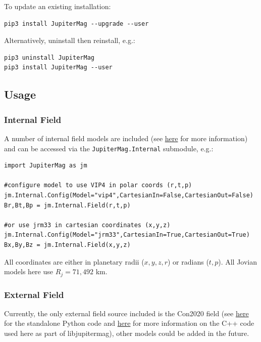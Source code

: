 		To update an existing installation:
	
		\begin{verbatim}
pip3 install JupiterMag --upgrade --user
		\end{verbatim}
	
		Alternatively, uninstall then reinstall, e.g.:
	
		\begin{verbatim}
pip3 uninstall JupiterMag
pip3 install JupiterMag --user
		\end{verbatim}
	
	\subsection{Usage}
	
	\subsubsection{Internal Field}
	
		A number of internal field models are included (see \href{https://github.com/mattkjames7/libinternalfield/blob/main/README.md}{here} for more information) and can be accessed via the \texttt{JupiterMag.Internal} submodule, e.g.:
	
		\begin{verbatim}
import JupiterMag as jm
	
#configure model to use VIP4 in polar coords (r,t,p)
jm.Internal.Config(Model="vip4",CartesianIn=False,CartesianOut=False)
Br,Bt,Bp = jm.Internal.Field(r,t,p)
	
#or use jrm33 in cartesian coordinates (x,y,z)
jm.Internal.Config(Model="jrm33",CartesianIn=True,CartesianOut=True)
Bx,By,Bz = jm.Internal.Field(x,y,z)
		\end{verbatim}
	
		All coordinates are either in planetary radii ($x,y,z,r$) or radians ($t,p$). All Jovian models here use $R_j=71,492$ km.
	
	\subsubsection{External Field}
	
		Currently, the only external field source included is the Con2020 field (see \href{https://github.com/gabbyprovan/con2020.git}{here} for the standalone Python code and \href{https://github.com/mattkjames7/libcon2020.git}{here} for more information on the C++ code used here as part of libjupitermag), other models could be added in the future.
		
